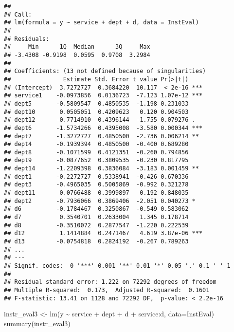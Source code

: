 \documentclass[
]{article}
\newenvironment{Shaded}{\begin{snugshade}}{\end{snugshade}}
\newcommand{\AttributeTok}[1]{\textcolor[rgb]{0.77,0.63,0.00}{#1}}
\newcommand{\FunctionTok}[1]{\textcolor[rgb]{0.00,0.00,0.00}{#1}}
\newcommand{\NormalTok}[1]{#1}
\newcommand{\OtherTok}[1]{\textcolor[rgb]{0.56,0.35,0.01}{#1}}
\newcommand{\SpecialCharTok}[1]{\textcolor[rgb]{0.00,0.00,0.00}{#1}}
\begin{document}
\begin{verbatim}
## 
## Call:
## lm(formula = y ~ service + dept + d, data = InstEval)
## 
## Residuals:
##     Min      1Q  Median      3Q     Max 
## -3.4308 -0.9198  0.0595  0.9708  3.2984 
## 
## Coefficients: (13 not defined because of singularities)
##               Estimate Std. Error t value Pr(>|t|)    
## (Intercept)  3.7272727  0.3684220  10.117  < 2e-16 ***
## service1    -0.0973856  0.0136723  -7.123 1.07e-12 ***
## dept5       -0.5809547  0.4850535  -1.198 0.231033    
## dept10       0.0505051  0.4209623   0.120 0.904503    
## dept12      -0.7714910  0.4396144  -1.755 0.079276 .  
## dept6       -1.5734266  0.4395008  -3.580 0.000344 ***
## dept7       -1.3272727  0.4850500  -2.736 0.006214 ** 
## dept4       -0.1939394  0.4850500  -0.400 0.689280    
## dept8       -0.1071599  0.4121351  -0.260 0.794856    
## dept9       -0.0877652  0.3809535  -0.230 0.817795    
## dept14      -1.2209398  0.3836084  -3.183 0.001459 ** 
## dept1       -0.2272727  0.5338941  -0.426 0.670336    
## dept3       -0.4965035  0.5005869  -0.992 0.321278    
## dept11       0.0766488  0.3999897   0.192 0.848035    
## dept2       -0.7936066  0.3869406  -2.051 0.040273 *  
## d6          -0.1784467  0.3250867  -0.549 0.583062    
## d7           0.3540701  0.2633004   1.345 0.178714    
## d8          -0.3510072  0.2877547  -1.220 0.222539    
## d12          1.1414884  0.2471467   4.619 3.87e-06 ***
## d13         -0.0754818  0.2824192  -0.267 0.789263    
## ...
## ---
## Signif. codes:  0 '***' 0.001 '**' 0.01 '*' 0.05 '.' 0.1 ' ' 1
## 
## Residual standard error: 1.222 on 72292 degrees of freedom
## Multiple R-squared:  0.173,  Adjusted R-squared:  0.1601 
## F-statistic: 13.41 on 1128 and 72292 DF,  p-value: < 2.2e-16
\end{verbatim}

\begin{Shaded}
\begin{Highlighting}[]
\NormalTok{instr\_eval3 }\OtherTok{\textless{}{-}} \FunctionTok{lm}\NormalTok{(y }\SpecialCharTok{\textasciitilde{}}\NormalTok{ service }\SpecialCharTok{+}\NormalTok{ dept }\SpecialCharTok{+}\NormalTok{ d }\SpecialCharTok{+}\NormalTok{ service}\SpecialCharTok{:}\NormalTok{d, }\AttributeTok{data=}\NormalTok{InstEval)}
\FunctionTok{summary}\NormalTok{(instr\_eval3)}
\end{Highlighting}
\end{Shaded}
\end{document}
